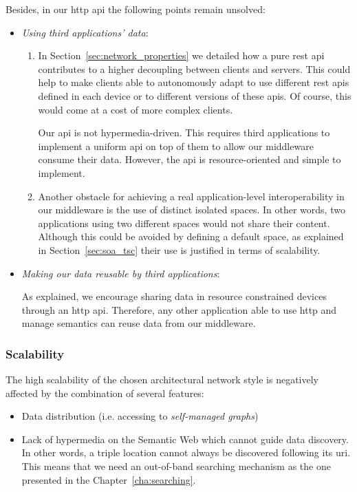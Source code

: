 Besides, in our \ac{http} \ac{api} the following points remain unsolved:
\begin{itemize} %
  \item \emph{Using third applications' data}:
  \begin{enumerate}
    \item In Section~\ref{sec:network_properties} we detailed how a pure \ac{rest} \ac{api} contributes to a higher decoupling between clients and servers.
	  This could help to make clients able to autonomously adapt to use different \ac{rest} \acp{api} defined in each device or to different versions of these \acp{api}. %
	  Of course, this would come at a cost of more complex clients. %
	  
	  Our \ac{api} is not hypermedia-driven.
	  This requires third applications to implement a uniform \ac{api} on top of them to allow our middleware consume their data.
	  However, the \ac{api} is resource-oriented and simple to implement. %
	  
    \item Another obstacle for achieving a real application-level interoperability in our middleware is the use of distinct isolated spaces.
	  In other words, two applications using two different spaces would not share their content.
	  Although this could be avoided by defining a default space, as explained in Section~\ref{sec:soa_tsc} their use is justified in terms of scalability.
  \end{enumerate}
  
  \item \emph{Making our data reusable by third applications}:
	
	As explained, we encourage sharing data in resource constrained devices through an \ac{http} \ac{api}. %
	Therefore, any other application able to use \ac{http} and manage semantics can reuse data from our middleware.
\end{itemize}


\subsubsection{Scalability}

The high scalability of the chosen architectural network style is negatively affected by the combination of several features:
\begin{itemize}
  \item Data distribution (i.e. accessing to \emph{self-managed graphs})
  \item Lack of hypermedia on the Semantic Web which cannot guide data discovery.
        In other words, a triple location cannot always be discovered following its \ac{uri}. %
        This means that we need an out-of-band searching mechanism as the one presented in the Chapter~\ref{cha:searching}.
\end{itemize}

